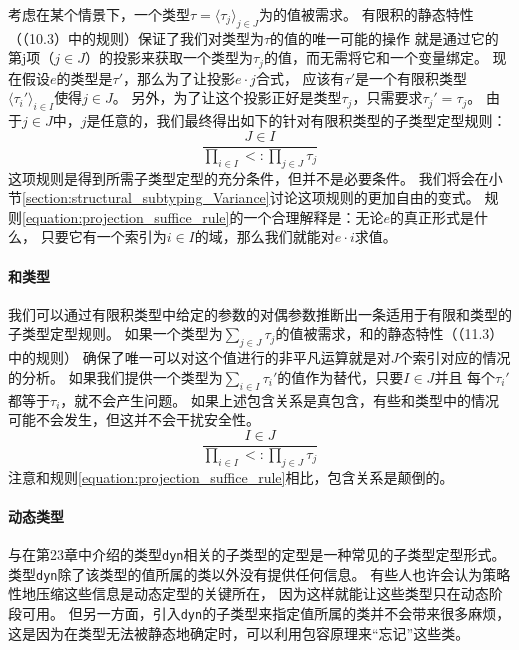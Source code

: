 考虑在某个情景下，一个类型$\tau=\langle\tau_j\rangle_{j\in J}$为的值被需求。
有限积的静态特性（（10.3）中的规则）保证了我们对类型为$\tau$的值的唯一可能的操作
就是通过它的第j项（$j\in J$）的投影来获取一个类型为$\tau_j$的值，而无需将它和一个变量绑定。
现在假设$e$的类型是$\tau{'}$，那么为了让投影$e\cdot j$合式，
应该有$\tau{'}$是一个有限积类型$\langle\tau_i{'}\rangle _{i\in I}$使得$j\in J$。
另外，为了让这个投影正好是类型$\tau _j$，只需要求$\tau _j {'}=\tau_j$。
由于$j\in J$中，$j$是任意的，我们最终得出如下的针对有限积类型的子类型定型规则：
\begin{equation}\label{equation:projection_suffice_rule}
	\frac{J \in I}{\prod_{i \in I}<:\prod_{j\in J}\tau_j}
\end{equation}
这项规则是得到所需子类型定型的充分条件，但并不是必要条件。
我们将会在小节\ref{section:structural_subtyping_Variance}讨论这项规则的更加自由的变式。
规则\ref{equation:projection_suffice_rule}的一个合理解释是：无论$e$的真正形式是什么，
只要它有一个索引为$i\in I$的域，那么我们就能对$e\cdot i$求值。

\paragraph{和类型}
我们可以通过有限积类型中给定的参数的对偶参数推断出一条适用于有限和类型的子类型定型规则。
如果一个类型为$\sum_{j\in J}\tau_j$的值被需求，和的静态特性（（11.3）中的规则）
确保了唯一可以对这个值进行的非平凡运算就是对$J$个索引对应的情况的分析。
如果我们提供一个类型为$\sum_{i\in I}\tau_i {'}$的值作为替代，只要$I \in J$并且
每个$\tau_i{'}$都等于$\tau_i$，就不会产生问题。
如果上述包含关系是真包含，有些和类型中的情况可能不会发生，但这并不会干扰安全性。
\begin{equation}
	\frac{I \in J}{\prod_{i \in I}<:\prod_{j\in J}\tau_j}
\end{equation}
注意和规则\ref{equation:projection_suffice_rule}相比，包含关系是颠倒的。

\paragraph{动态类型}
与在第23章中介绍的类型\texttt{dyn}相关的子类型的定型是一种常见的子类型定型形式。
类型\texttt{dyn}除了该类型的值所属的类以外没有提供任何信息。
有些人也许会认为策略性地压缩这些信息是动态定型的关键所在，
因为这样就能让这些类型只在动态阶段可用。
但另一方面，引入\texttt{dyn}的子类型来指定值所属的类并不会带来很多麻烦，
这是因为在类型无法被静态地确定时，可以利用包容原理来“忘记”这些类。

